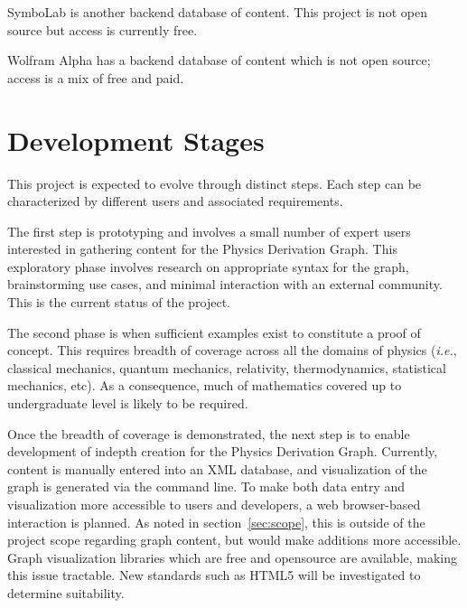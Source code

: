 \documentclass{article}
\newcommand{\ie}{\textit{i.e.}} %
\newcommand{\pdg}{Physics Derivation Graph}
\begin{document}
\begin{multicols}{2}
SymboLab\cite{2015_Symbolab} is another backend database of content. This project is not open source but access is currently free. 

Wolfram Alpha\cite{2015_WolframAlpha} has a backend database of content which is not open source; access is a mix of free and paid. 

\section{Development Stages\label{sec:stages}}

This project is expected to evolve through distinct steps. Each step can be characterized by different users and associated requirements. 

The first step is prototyping and involves a small number of expert users interested in gathering content for the \pdg. This exploratory phase involves research on appropriate syntax for the graph, brainstorming use cases, and minimal interaction with an external community. This is the current status of the project.

The second phase is when sufficient examples exist to constitute a proof of concept. This requires breadth of coverage across all the domains of physics (\ie, classical mechanics, quantum mechanics, relativity, thermodynamics, statistical mechanics, etc). As a consequence, much of mathematics covered up to undergraduate level is likely to be required. 

Once the breadth of coverage is demonstrated, the next step is to enable development of indepth creation for the \pdg. Currently, content is manually entered into an XML database, and visualization of the graph is generated via the command line. To make both data entry and visualization more accessible to users and developers, a web browser-based interaction is planned. As noted in section~\ref{sec:scope}, this is outside of the project scope regarding graph content, but would make additions more accessible. Graph visualization libraries which are free and opensource are available, making this issue tractable. New standards such as HTML5 will be investigated to determine suitability. 


\end{multicols}
\end{document}
